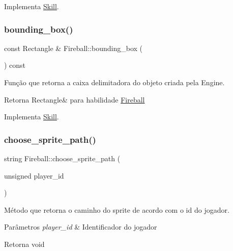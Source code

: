 Implementa \mbox{\hyperlink{classSkill_a1744c0c7f03304b1a0444a1bd95661c0}{Skill}}.

\mbox{\label{classFireball_a3c91f2eceddb1d7f317cc6961976ac68}} 
\subsubsection{\texorpdfstring{bounding\+\_\+box()}{bounding\_box()}}
{\footnotesize\ttfamily const Rectangle \& Fireball\+::bounding\+\_\+box (\begin{DoxyParamCaption}{ }\end{DoxyParamCaption}) const\hspace{0.3cm}{\ttfamily [virtual]}}



Função que retorna a caixa delimitadora do objeto criada pela Engine. 

\begin{DoxyReturn}{Retorna}
Rectangle\& para habilidade \mbox{\hyperlink{classFireball}{Fireball}} 
\end{DoxyReturn}


Implementa \mbox{\hyperlink{classSkill}{Skill}}.

\mbox{\label{classFireball_a4a5554e5ffa7f3b7811815515dfcf6a4}} 
\subsubsection{\texorpdfstring{choose\+\_\+sprite\+\_\+path()}{choose\_sprite\_path()}}
{\footnotesize\ttfamily string Fireball\+::choose\+\_\+sprite\+\_\+path (\begin{DoxyParamCaption}\item[{unsigned}]{player\+\_\+id }\end{DoxyParamCaption})\hspace{0.3cm}{\ttfamily [protected]}}



Método que retorna o caminho do sprite de acordo com o id do jogador. 


\begin{DoxyParams}{Parâmetros}
{\em player\+\_\+id} & Identificador do jogador \\
\hline
\end{DoxyParams}
\begin{DoxyReturn}{Retorna}
void 
\end{DoxyReturn}
\mbox{\label{classFireball_a312843f3db953d32b52d337bdc07cc1d}} 
